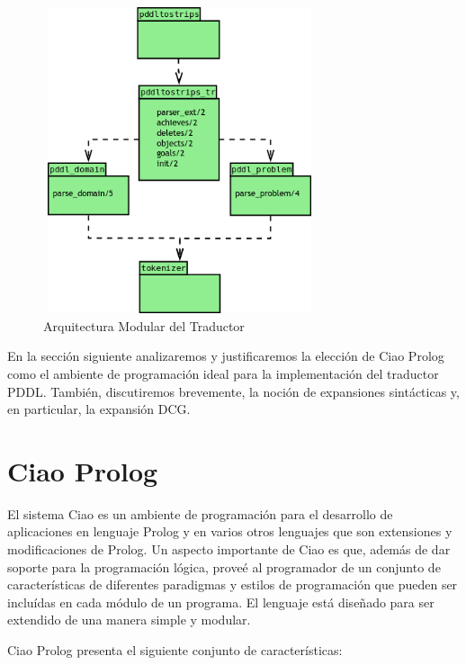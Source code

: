 	\begin{figure}
	\centering
		\includegraphics[width=8cm,height=9cm]{UMLParser.png} 
		\caption{Arquitectura Modular del Traductor}
		\label{pddl:modules}
	\end{figure}

        En la secci\'on siguiente analizaremos y
        justificaremos la elecci\'on de Ciao Prolog como el am\-bien\-te
        de programaci\'on ideal para la implementaci\'on del
        traductor PDDL. Tambi\'en, discutiremos brevemente, la noci\'on de expansiones
        sint\'acticas y, en particular, la expansi\'on DCG.

        \section{Ciao Prolog} \label{cap5:Ciao}

	El sistema Ciao \cite{ciao-reference-manual-tr} es un ambiente
        de programaci\'on para el desarrollo de aplicaciones en
        lenguaje Prolog \cite{shapiro:1997:APA:6686} y en varios otros 
        lenguajes que son extensiones y modificaciones de Prolog. 
        Un aspecto importante de Ciao es que, adem\'as de dar soporte 
        para la programaci\'on l\'ogica, prove\'e al programador de un 
        conjunto de caracter\'isticas de diferentes paradigmas y
        estilos de programaci\'on que 
	pueden ser inclu\'idas en cada m\'odulo de un programa. 
        El lenguaje est\'a dise\~{n}ado para ser 
	extendido de una manera simple y modular.
	
	Ciao Prolog presenta el siguiente conjunto de caracter\'isticas:
	
